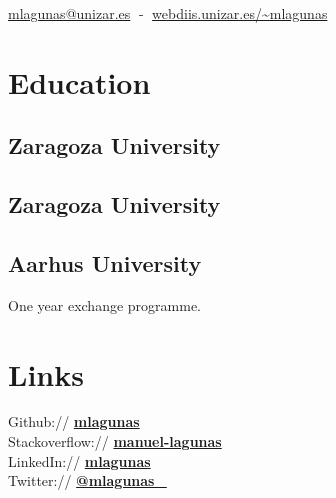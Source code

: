 \documentclass[]{resume}
\begin{document}
%
%
\lastupdated

%
%
{\href{mailto:mlagunas@unizar.es}{mlagunas@unizar.es}$\;$ 
-
$\;$\href{http://webdiis.unizar.es/~mlagunas/}{webdiis.unizar.es/\textasciitilde mlagunas}
}

%
%

\begin{minipage}[t]{0.33\textwidth} 


\section{Education} 

\subsection{Zaragoza University}
\sectionsep

\subsection{Zaragoza University}
\sectionsep

\subsection{Aarhus University}
One year exchange programme.
\sectionsep


\section{Links} 
Github:// \href{https://github.com/mlagunas}{\bf mlagunas} \\
Stackoverflow://  \href{https://stackoverflow.com/users/6076729/manuel-lagunas?tab=profile}{\bf manuel-lagunas} \\
LinkedIn://  \href{https://www.linkedin.com/in/mlagunas/}{\bf mlagunas} \\
Twitter://  \href{https://twitter.com/mlagunas_}{\bf @mlagunas\_} \\


\end{minipage}
\end{document}
